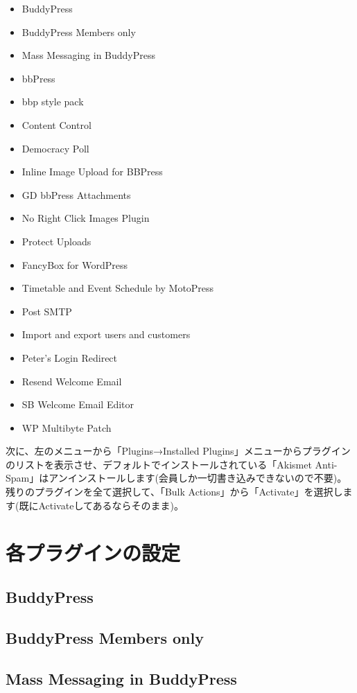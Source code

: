 \documentclass[titlepage,10pt,a4paper,uplatex]{jsbook}
\begin{document}
\begin{itemize}
\item BuddyPress
\item BuddyPress Members only
\item Mass Messaging in BuddyPress
\item bbPress
\item bbp style pack
\item Content Control
\item Democracy Poll
\item Inline Image Upload for BBPress
\item GD bbPress Attachments
\item No Right Click Images Plugin
\item Protect Uploads
\item FancyBox for WordPress
\item Timetable and Event Schedule by MotoPress
\item Post SMTP
\item Import and export users and customers
\item Peter's Login Redirect
\item Resend Welcome Email
\item SB Welcome Email Editor
\item WP Multibyte Patch
\end{itemize}

次に、左のメニューから「Plugins→Installed Plugins」メニューからプラグインのリストを表示させ、デフォルトでインストールされている「Akismet Anti-Spam」はアンインストールします(会員しか一切書き込みできないので不要)。
残りのプラグインを全て選択して、「Bulk Actions」から「Activate」を選択します(既にActivateしてあるならそのまま)。

\section{各プラグインの設定}

\subsection{BuddyPress}

\subsection{BuddyPress Members only}

\subsection{Mass Messaging in BuddyPress}
\end{document}
